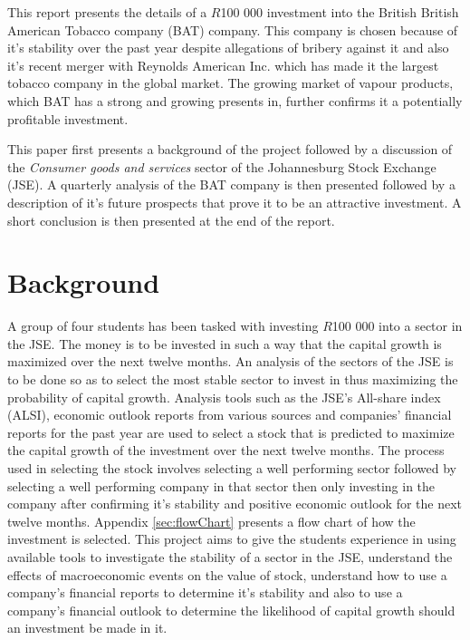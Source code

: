 \documentclass[letterpaper, 10 pt, conference]{ieeeconf}  %
\begin{document}
This report presents the details of a $R$100 000 investment into the British British American Tobacco company (BAT) company. This company is chosen because of it's stability over the past year despite allegations of bribery against it and also it's recent merger with Reynolds American Inc. which has made it the largest tobacco company in the global market. The growing market of vapour products, which BAT has a strong and growing presents in, further confirms it a potentially profitable investment.

This paper first presents a background of the project followed by a discussion of the \textit{Consumer goods and services} sector of the Johannesburg Stock Exchange (JSE). A quarterly analysis of the BAT company is then presented followed by a description of it's future prospects that prove it to be an attractive investment. A short conclusion is then presented at the end of the report. 

\section{Background}

A group of four students has been tasked with investing $R$100 000 into a sector in the JSE. The money is to be invested in such a way that the capital growth is maximized over the next twelve months. An analysis of the sectors of the JSE is to be done so as to select the most stable sector to invest in thus maximizing the probability of capital growth. Analysis tools such as the JSE's All-share index (ALSI), economic outlook reports from various sources and companies' financial reports for the past year are used to select a stock that is predicted to maximize the capital growth of the investment over the next twelve months. The process used in selecting the stock involves selecting a well performing sector followed by selecting a well performing company in that sector then only investing in the company after confirming it's stability and positive economic outlook for the next twelve months. Appendix \ref{sec:flowChart} presents a flow chart of how the investment is selected. This project aims to give the students experience in using available tools to investigate the stability of a sector in the JSE, understand the effects of macroeconomic events on the value of stock, understand how to use a company's financial reports to determine it's stability and also to use a company's financial outlook to determine the likelihood of capital growth should an investment be made in it. 
\end{document}
